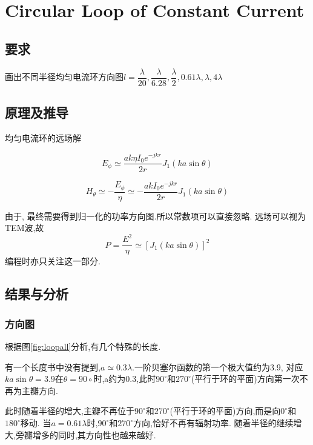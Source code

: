 

\section{Circular Loop  of Constant Current}
\subsection{要求}
\noindent 画出不同半径均匀电流环方向图$l=\dfrac{\lambda}{20},\dfrac{\lambda}{6.28},\dfrac{\lambda}{2},0.61\lambda,\lambda,4\lambda$ 

\subsection{原理及推导}
均匀电流环的远场解


\begin{equation}
E_\phi\simeq \dfrac{ak\eta I_0e^{-jkr}}{2r} J_1\left( ka\sin\theta\right)
\end{equation}


\begin{equation}
H_\theta\simeq -\dfrac{E_\phi}{\eta}
\simeq -\dfrac{ak I_0e^{-jkr}}{2r} J_1\left( ka\sin\theta\right)
\end{equation}

由于, 最终需要得到归一化的功率方向图.所以常数项可以直接忽略. 
远场可以视为TEM波,故
\begin{equation}
P=\dfrac{E^2}{\eta} \simeq \left[J_1\left( ka\sin\theta\right)\right]^2
\end{equation}
编程时亦只关注这一部分. 


\subsection{结果与分析}
\subsubsection{方向图}
根据图\ref{fig:loopall}分析,有几个特殊的长度.

有一个长度书中没有提到,$a\simeq0.3\lambda$.一阶贝塞尔函数的第一个极大值约为3.9, 对应$ka\sin\theta=3.9$在$\theta=90\circ$时,a约为0.3,此时$90^\circ$和$270^\circ$(平行于环的平面)方向第一次不再为主瓣方向. 

此时随着半径的增大,主瓣不再位于$90^\circ$和$270^\circ$(平行于环的平面)方向,而是向$0^\circ $和$180^\circ $移动. 当$a=0.61\lambda$时,$90^\circ$和$270^\circ$方向,恰好不再有辐射功率. 随着半径的继续增大,旁瓣增多的同时,其方向性也越来越好.

